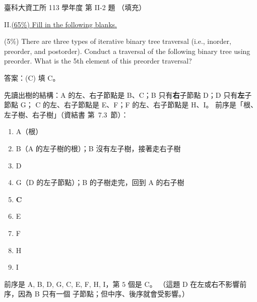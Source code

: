 \begin{pastexam}[label={px:ntust-113-ice-08}]{臺科大資工所 113 學年度 第 II-2 題}
（填充）

II.\quad \underline{(65\%) Fill in the following blanks.}

(5\%) There are three types of iterative binary tree traversal (i.e., inorder, preorder, and
postorder). Conduct a traversal of the following binary tree using preorder. What is the 5th element
of this preorder traversal? 
\begin{center}
\end{center}
\end{pastexam}

\begin{pastsoln}
答案：(C) 填 C。

先讀出樹的結構：A 的左、右子節點是 B、C；B 只有\textbf{右}子節點 D；D 只有\textbf{左}子節點 G；
C 的左、右子節點是 E、F；F 的左、右子節點是 H、I。 前序是「根、左子樹、右子樹」（資結書
第~7.3~節）：
\begin{enumerate}
\item A（根）
\item B（A 的左子樹的根）；B 沒有左子樹，接著走右子樹
\item D
\item G（D 的左子節點）；B 的子樹走完，回到 A 的右子樹
\item \textbf{C}
\item E
\item F
\item H
\item I
\end{enumerate}
前序是 A, B, D, G, C, E, F, H, I，第 $5$ 個是 C。 （這題 D 在左或右不影響前序，因為 B 只有一個
子節點；但中序、後序就會受影響。）
\end{pastsoln}
